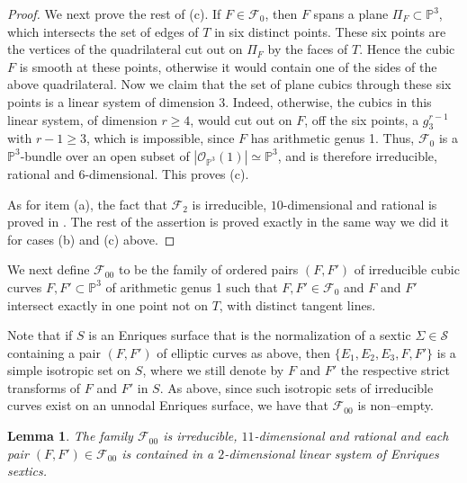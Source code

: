 \documentclass[11pt]{amsart}
\newtheorem{lemma}[thm]{Lemma}
\theoremstyle{definition}
\def\PP{{\mathbb P}}
\def\O{{\mathcal O}}
\def\F{{\mathcal F}}
\def\cong{\simeq}
\renewcommand{\geq}{\geqslant}
\begin{document}
\begin{proof}
\color{black} We next prove the rest of (c). \color{black}  If $F \in \F_0$, then $F$ spans a plane $\Pi_F \subset \PP^3$, which intersects the set of edges of $T$ in six \color{black} distinct \color{black} points. \color{black} These six points are the vertices of the quadrilateral cut out on $\Pi_F$ by the faces of $T$. Hence the cubic $F$ is smooth at these points, otherwise it would contain one of the sides of the above quadrilateral. Now we claim that \color{black} the set of plane cubics through these six points is a linear system of dimension 3. \color{black} Indeed, otherwise, the cubics in this linear system, of dimension $r\geq 4$, would cut out on $F$, off the six points, a $g^{r-1}_3$ with $r-1\geq 3$, which is impossible, since $F$ has arithmetic genus 1. \color{black} Thus, $\F_0$ is a $\PP^3$-bundle over \color{black} an open subset of \color{black} $|\O_{\PP^3}(1)| \cong \PP^3$, and is therefore irreducible, rational and $6$-dimensional. This proves (c).


As for item (a),  the fact that $\F_2$ is irreducible, $10$-dimensional and rational is proved in \cite[Prop. 1.1 and \S 2]{Ve}. The rest of the assertion is proved exactly in the same way we did it for cases (b) and (c) above.  \end{proof}

  

We next define $\F_{00}$ to be the family of ordered pairs $(F,F')$ of \color{black} irreducible \color{black} cubic curves $F, F' \subset \PP^3$ \color{black} of arithmetic genus 1 \color{black} such that $F, F' \in \F_0$ and $F$ and $F'$ intersect exactly in one point not on $T$, with distinct tangent lines. 

\color{black} Note that if $S$ is an Enriques surface that is
the normalization of a sextic $\Sigma \in \mathcal{S}$ containing a
pair $(F,F')$ of elliptic curves as above,
then $\{E_1,E_2,E_3, F, F'\}$ is a simple isotropic set on $S$,
where we still denote by $F$ and $F'$ the respective strict transforms
of $F$ and $F'$ in $S$. \color{black} As above, since such  isotropic sets of irreducible curves exist on an unnodal Enriques surface, we have that  $\F_{00}$ is non--empty. 
\color{black}


\begin{lemma} \label{lemma:irr+solouna2}
  The family $\F_{00}$ is irreducible, $11$-dimensional and rational and each pair $(F,F') \in \F_{00}$ is contained in a $2$-dimensional linear system of Enriques sextics.
\end{lemma}
\end{document}
